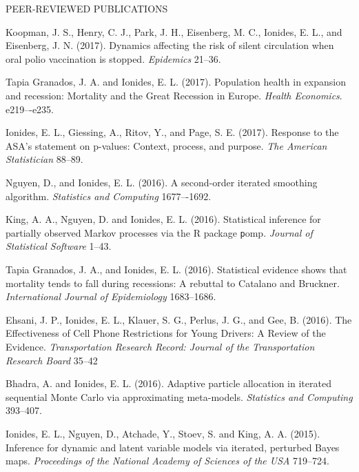 \begin{reflist}{PEER-REVIEWED PUBLICATIONS}
\item Koopman, J. S., Henry, C. J., Park, J. H., Eisenberg, M. C., Ionides, E. L., and Eisenberg, J. N. (2017). Dynamics affecting the risk of silent circulation when oral polio vaccination is stopped. {\it Epidemics} {}{\separator}21--36. 

\item Tapia Granados, J. A. and Ionides, E. L. (2017). Population health in expansion and recession: Mortality and the Great Recession in Europe. {\it Health Economics}. {}{\separator}e219–-e235.

\item Ionides, E. L., Giessing, A., Ritov, Y., and Page, S. E. (2017).
Response to the ASA's statement on p-values: Context, process, and purpose. {\em The American Statistician} {}{\separator}88--89.

\item Nguyen, D., and Ionides, E. L. (2016). A second-order iterated smoothing algorithm. {\em Statistics and Computing} {}{\separator}1677–-1692.

\item King, A. A., Nguyen, D. and Ionides, E. L. (2016). Statistical inference for partially observed Markov processes via the R package {\texttt pomp}. {\em Journal of Statistical Software} {}{\separator}1--43.

\item  Tapia Granados, J. A.,  and Ionides, E. L. (2016). Statistical evidence shows that mortality tends to fall during recessions: A rebuttal to Catalano and Bruckner. {\em International Journal of Epidemiology} {}{\separator}1683--1686.

\item Ehsani, J. P.,  Ionides, E. L., Klauer, S. G., Perlus,  J. G., and Gee, B. (2016). The Effectiveness of Cell Phone Restrictions for Young Drivers: A Review of the Evidence. {\em Transportation Research Record: Journal of the Transportation Research Board} {}{\separator}35–42

\item
Bhadra, A. and Ionides, E. L. (2016). Adaptive particle allocation in iterated sequential Monte Carlo via approximating meta-models. {\em Statistics and Computing} {}{\separator}393--407.

\item Ionides, E. L., Nguyen, D., Atchade, Y., Stoev, S. and King, A. A. (2015). Inference for dynamic and latent variable models via iterated, perturbed Bayes maps.  {\em Proceedings of the National Academy of Sciences of the USA} {}{\separator}719--724.


\end{reflist}
